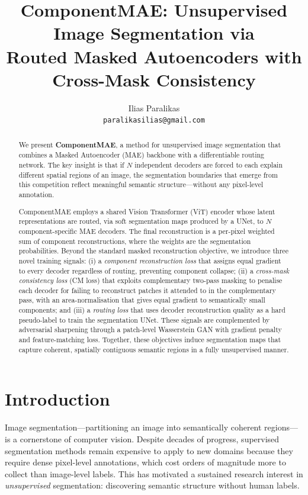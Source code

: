 \documentclass{article}
\title{ComponentMAE: Unsupervised Image Segmentation via\\
Routed Masked Autoencoders with Cross-Mask Consistency}
\author{%
  Ilias Paralikas \\
  \texttt{paralikasilias@gmail.com}
}
\begin{document}
\maketitle

\begin{abstract}
We present \textbf{ComponentMAE}, a method for unsupervised image segmentation that
combines a Masked Autoencoder (MAE) backbone with a differentiable routing network.
The key insight is that if $N$ independent decoders are forced to each explain
different spatial regions of an image, the segmentation boundaries that emerge from
this competition reflect meaningful semantic structure---without any pixel-level
annotation.

ComponentMAE employs a shared Vision Transformer (ViT) encoder whose latent
representations are routed, via soft segmentation maps produced by a UNet, to $N$
component-specific MAE decoders.  The final reconstruction is a per-pixel weighted
sum of component reconstructions, where the weights are the segmentation probabilities.
Beyond the standard masked reconstruction objective, we introduce three novel
training signals: (i) a \emph{component reconstruction loss} that assigns equal
gradient to every decoder regardless of routing, preventing component collapse;
(ii) a \emph{cross-mask consistency loss} (CM loss) that exploits complementary
two-pass masking to penalise each decoder for failing to reconstruct patches it
attended to in the complementary pass, with an area-normalisation that gives
equal gradient to semantically small components; and (iii) a \emph{routing loss}
that uses decoder reconstruction quality as a hard pseudo-label to train the
segmentation UNet.  These signals are complemented by adversarial sharpening
through a patch-level Wasserstein GAN with gradient penalty and feature-matching
loss.  Together, these objectives induce segmentation maps that capture coherent,
spatially contiguous semantic regions in a fully unsupervised manner.
\end{abstract}

\section{Introduction}
\label{sec:intro}

Image segmentation---partitioning an image into semantically coherent regions---is
a cornerstone of computer vision.  Despite decades of progress, supervised
segmentation methods remain expensive to apply to new domains because they require
dense pixel-level annotations, which cost orders of magnitude more to collect than
image-level labels.  This has motivated a sustained research interest in
\emph{unsupervised} segmentation: discovering semantic structure without human
labels.
\end{document}
